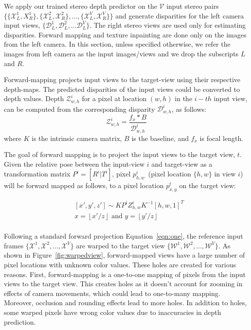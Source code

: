\documentclass[runningheads]{llncs}
\begin{document}
We apply our trained stereo depth predictor on the $\mathcal{V}$ input stereo pairs $\{\{\mathcal{X}^{1}_{L}, X^{1}_{R}\},\{\mathcal{X}^{2}_{L}, \mathcal{X}^{2}_{R}\}, \dots,  \{\mathcal{X}^{V}_{L}, \mathcal{X}^{V}_{R}\}\}$ and generate disparities for the left camera input views, $\{\mathcal{D}^{1}_{L}, \mathcal{D}^{2}_{L}, \dots \mathcal{D}^{V}_{L}\}$. The right stereo views are used only for estimating disparities. Forward mapping and texture inpainting are done only on the images from the left camera. In this section, unless specified otherwise, we refer the images from left camera as the input images/views and we drop the subscripts $L$ and $R$.

Forward-mapping projects input views to the target-view using their respective depth-maps. The predicted disparities of the input views could be converted to depth values. Depth $\mathcal{Z}^{i}_{w,h}$ for a pixel at location $(w,h)$ in the $i-th$ input view, can be computed from the corresponding disparity $\mathcal{D}^{i}_{w,h}$, as follows:
\begin{equation}
    \mathcal{Z}^{i}_{w,h} = \frac{f_{x}*B}{\mathcal{D}^{i}_{w,h}}
\end{equation}
where $K$ is the intrinsic camera matrix, $B$ is the baseline, and $f_{x}$ is focal length.

The goal of forward mapping is to project the input views to the target view, $t$. Given the relative pose between the input-view $i$ and target-view as a transformation matrix $P^{i} = [R^{i}|T^{i}]$, pixel $p_{h,w}^{i}$~(pixel location $\{h,w\}$ in view $i$) will be forward mapped as follows, to a pixel location $p^{t}_{x,y}$ on the target view:

\begin{equation}
\begin{aligned}
&\left[x',y',z' \right] \sim  KP^{i}Z^{i}_{h,w}K^{-1}[h,w,1]^{T} \\
&x = \left \lfloor{x'/z}\right \rfloor \text{ and } y = \left \lfloor{y'/z}\right \rfloor \\
\end{aligned}
\label{eqn:one}
\end{equation}

Following a standard forward projection Equation~\ref{eqn:one}, the reference input frames $\{\mathcal{X}^{1}, \mathcal{X}^{2}, \dots, \mathcal{X}^{V}\} $ are warped to the target view $\{\mathcal{W}^{1}, \mathcal{W}^{2}, \dots, \mathcal{W}^{V}\}$. As shown in Figure~\ref{fig:warpedview}, forward-mapped views have a large number of pixel locations with unknown color values. These holes are created for various reasons. First, forward-mapping is a one-to-one mapping of pixels from the input views to the target view. This creates holes as it doesn't account for zooming in effects of camera movements, which could lead to one-to-many mapping. Moreover, occlusion and rounding effects lead to more holes. In addition to holes, some warped pixels have wrong color values due to inaccuracies in depth prediction.
\end{document}
